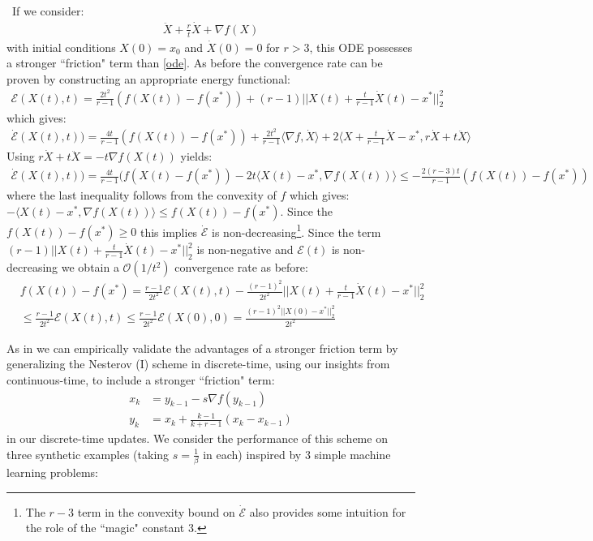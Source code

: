 \
If we consider:
\begin{align}
    \ddot{X} + \frac{r}{t} \dot{X} + \nabla f(X) \label{highfrictionode}
\end{align}
with initial conditions $X(0) = x_0$ and $\dot{X}(0) = 0$ for $r>3$, this ODE possesses a stronger ``friction" term than \eqref{ode}. As before the convergence rate can be proven by constructing an appropriate energy functional:
\begin{align*}
    \mathcal{E}(X(t), t) = \frac{2t^2}{r-1} \left( f(X(t)) -f(x^*) \right) + (r-1) ||X(t) + \frac{t}{r-1}\dot{X}(t) -x^*||_2^2
\end{align*}
which gives:
\begin{align*}
    \dot{\mathcal{E}}(X(t), t)) = \frac{4t}{r-1}(f(X(t)) - f(x^*)) + \frac{2t^2}{r-1} \langle \nabla f, \dot{X} \rangle + 2 \langle X + \frac{t}{r-1} \dot{X} - x^*, r \dot{X} + t \ddot{X} \rangle
\end{align*}
Using $r\dot{X} + t \ddot{X} = -t \nabla f(X(t))$ yields:
\begin{align*}
    \dot{\mathcal{E}}(X(t), t)) = \frac{4t}{r-1} (f(X(t) - f(x^*)) - 2t \langle X(t) - x^*, \nabla f(X(t)) \rangle \leq - \frac{2(r-3)t}{r-1}(f(X(t))-f(x^*))
\end{align*}
where the last inequality follows from the convexity of $f$ which gives: $-\langle X(t) - x^*, \nabla f(X(t)) \rangle \leq f(X(t)) - f(x^*)$. Since the $f(X(t)) - f(x^*) \geq 0$ this implies $\dot{\mathcal{E}}$ is non-decreasing\footnote{The $r-3$ term in the convexity bound on $\dot{\mathcal{E}}$ also provides some intuition for the role of the ``magic" constant $3$.}. Since the term $(r-1) ||X(t) + \frac{t}{r-1} \dot{X}(t) - x^*||_2^2$ is non-negative and $\mathcal{E}(t)$ is non-decreasing we obtain a $\mathcal{O}(1/t^2)$ convergence rate as before:
\begin{align*}
    & f(X(t)) - f(x^*) = \frac{r-1}{2t^2} \mathcal{E}(X(t), t) - \frac{(r-1)^2}{2t^2} ||X(t) + \frac{t}{r-1} \dot{X}(t) - x^*||_2^2 \\
    & \leq \frac{r-1}{2t^2} \mathcal{E}(X(t), t) \leq \frac{r-1}{2t^2} \mathcal{E}(X(0), 0) = \frac{(r-1)^2 ||X(0)-x^*||_2^2}{2 t^2}
\end{align*}

As in \cite{su2014differential} we can empirically validate the advantages of a stronger friction term by generalizing the Nesterov (I) scheme in discrete-time, using our insights from continuous-time, to include a stronger ``friction" term:
\begin{align}
    x_k &= y_{k-1} - s \nabla f(y_{k-1})\\
    y_k &= x_k + \frac{k-1}{k+r-1} (x_k - x_{k-1}) \label{nesterov}
\end{align}
in our discrete-time updates. We consider the performance of this scheme on three synthetic examples (taking $s=\frac{1}{\beta}$ in each) inspired by 3 simple machine learning problems:

